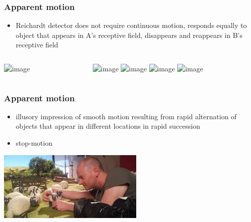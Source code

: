 \documentclass[]{beamer}
\begin{document}
\begin{frame}
 \frametitle{Apparent motion}
 \begin{overlayarea}{110mm}{80mm}
\begin{itemize}
   \item Reichardt detector does not require continuous motion, responds equally to object that appears in A's receptive field, disappears and reappears in B's receptive field
\end{itemize}

\begin{columns}[T]
 \begin{column}{40mm}
\includegraphics<1->[width=30mm]{figs/l7/reichardt_detector_single.png}
 \end{column}

 \begin{column}{40mm}
\begin{center}
\includegraphics<2>[width=40mm]{figs/l7/daumenkino_daffy_1.png} 
\includegraphics<3>[width=40mm]{figs/l7/daumenkino_daffy_2.png} 
\includegraphics<4>[width=40mm]{figs/l7/daumenkino_daffy_3.png} 
\includegraphics<5>[width=40mm]{figs/l7/daumenkino_daffy_4.png} 
\end{center}
\end{column}
\end{columns}
\end{overlayarea}
\end{frame}


\begin{frame}
\frametitle{Apparent motion}
 \begin{itemize}
 \item illusory impression of smooth motion resulting from rapid alternation of objects that appear in different locations in rapid succession
 \item stop-motion
\end{itemize}
\begin{center}
\includegraphics[width=70mm]{figs/l7/filming_shaun2.jpg} 
\end{center}
\end{frame}
\end{document}
